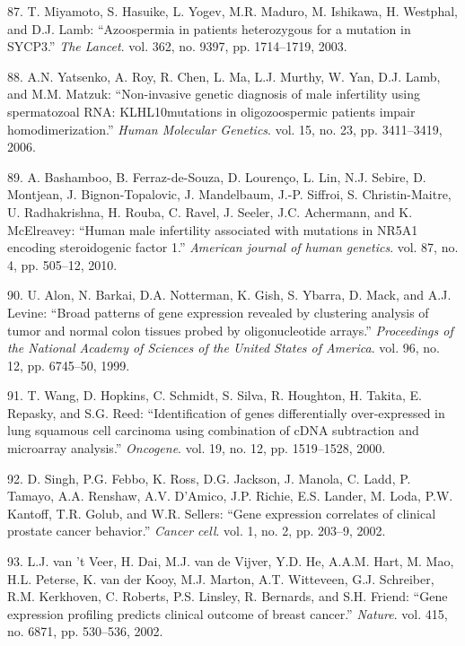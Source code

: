 \documentclass[12pt,twoside]{reedthesis}
\theoremstyle{definition}
\theoremstyle{definition}
\theoremstyle{remark}
\begin{document}
  \hypertarget{ref-Miyamoto2003}{}
  87. T. Miyamoto, S. Hasuike, L. Yogev, M.R. Maduro, M. Ishikawa, H.
  Westphal, and D.J. Lamb: ``Azoospermia in patients heterozygous for a
  mutation in SYCP3.'' \emph{The Lancet}. vol. 362, no. 9397, pp.
  1714--1719, 2003.
  
  \hypertarget{ref-Yatsenko2006}{}
  88. A.N. Yatsenko, A. Roy, R. Chen, L. Ma, L.J. Murthy, W. Yan, D.J.
  Lamb, and M.M. Matzuk: ``Non-invasive genetic diagnosis of male
  infertility using spermatozoal RNA: KLHL10mutations in oligozoospermic
  patients impair homodimerization.'' \emph{Human Molecular Genetics}.
  vol. 15, no. 23, pp. 3411--3419, 2006.
  
  \hypertarget{ref-Bashamboo2010}{}
  89. A. Bashamboo, B. Ferraz-de-Souza, D. Lourenço, L. Lin, N.J. Sebire,
  D. Montjean, J. Bignon-Topalovic, J. Mandelbaum, J.-P. Siffroi, S.
  Christin-Maitre, U. Radhakrishna, H. Rouba, C. Ravel, J. Seeler, J.C.
  Achermann, and K. McElreavey: ``Human male infertility associated with
  mutations in NR5A1 encoding steroidogenic factor 1.'' \emph{American
  journal of human genetics}. vol. 87, no. 4, pp. 505--12, 2010.
  
  \hypertarget{ref-Alon1999}{}
  90. U. Alon, N. Barkai, D.A. Notterman, K. Gish, S. Ybarra, D. Mack, and
  A.J. Levine: ``Broad patterns of gene expression revealed by clustering
  analysis of tumor and normal colon tissues probed by oligonucleotide
  arrays.'' \emph{Proceedings of the National Academy of Sciences of the
  United States of America}. vol. 96, no. 12, pp. 6745--50, 1999.
  
  \hypertarget{ref-Wang2000}{}
  91. T. Wang, D. Hopkins, C. Schmidt, S. Silva, R. Houghton, H. Takita,
  E. Repasky, and S.G. Reed: ``Identification of genes differentially
  over-expressed in lung squamous cell carcinoma using combination of cDNA
  subtraction and microarray analysis.'' \emph{Oncogene}. vol. 19, no. 12,
  pp. 1519--1528, 2000.
  
  \hypertarget{ref-Singh2002}{}
  92. D. Singh, P.G. Febbo, K. Ross, D.G. Jackson, J. Manola, C. Ladd, P.
  Tamayo, A.A. Renshaw, A.V. D'Amico, J.P. Richie, E.S. Lander, M. Loda,
  P.W. Kantoff, T.R. Golub, and W.R. Sellers: ``Gene expression correlates
  of clinical prostate cancer behavior.'' \emph{Cancer cell}. vol. 1, no.
  2, pp. 203--9, 2002.
  
  \hypertarget{ref-VantVeer2002}{}
  93. L.J. van 't Veer, H. Dai, M.J. van de Vijver, Y.D. He, A.A.M. Hart,
  M. Mao, H.L. Peterse, K. van der Kooy, M.J. Marton, A.T. Witteveen, G.J.
  Schreiber, R.M. Kerkhoven, C. Roberts, P.S. Linsley, R. Bernards, and
  S.H. Friend: ``Gene expression profiling predicts clinical outcome of
  breast cancer.'' \emph{Nature}. vol. 415, no. 6871, pp. 530--536, 2002.
  
\end{document}
